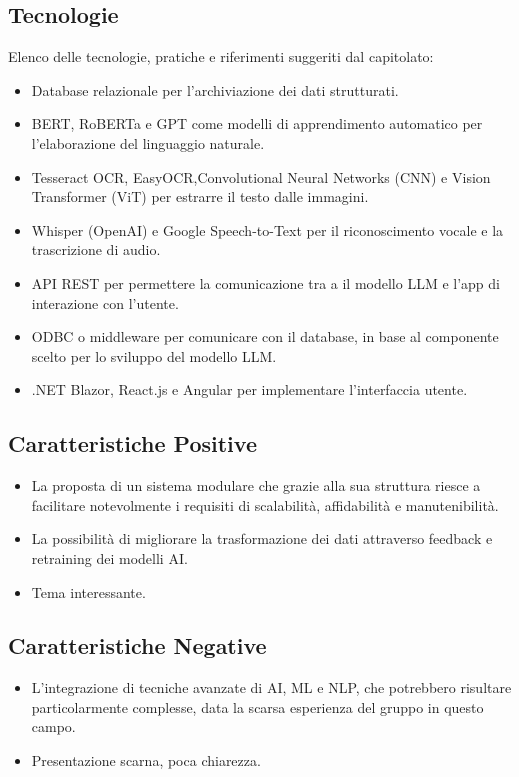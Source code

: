 \documentclass[a4paper,12pt]{article}
\begin{document}
    \subsection{Tecnologie}
    Elenco delle tecnologie, pratiche e riferimenti suggeriti dal capitolato:
    \begin{itemize}
		\item Database relazionale per l’archiviazione dei dati strutturati.
		\item BERT, RoBERTa e GPT come modelli di apprendimento automatico per l’elaborazione del linguaggio naturale.
		\item Tesseract OCR, EasyOCR,Convolutional Neural Networks (CNN) e Vision Transformer (ViT) per estrarre il testo dalle immagini.
		\item Whisper (OpenAI) e Google Speech-to-Text per il riconoscimento vocale e la trascrizione di audio.
		\item API REST per permettere la comunicazione tra a il modello LLM e l’app di interazione con l’utente.
		\item ODBC o middleware per comunicare con il database, in base al componente scelto per lo sviluppo del modello LLM.
		\item .NET Blazor, React.js e Angular per implementare l’interfaccia utente.
    \end{itemize}
    \subsection{Caratteristiche Positive}
    \begin{itemize}
		\item La proposta di un sistema modulare che grazie alla sua struttura riesce a facilitare notevolmente i requisiti di scalabilità, affidabilità e manutenibilità.
		\item La possibilità di migliorare la trasformazione dei dati attraverso feedback e retraining dei modelli AI.
		\item Tema interessante.
    \end{itemize}
    \subsection{Caratteristiche Negative}
    \begin{itemize}
		\item L’integrazione di tecniche avanzate di AI, ML e NLP, che potrebbero risultare particolarmente complesse, data la scarsa esperienza del gruppo in questo campo.
		\item Presentazione scarna, poca chiarezza.
    \end{itemize}
\end{document}
